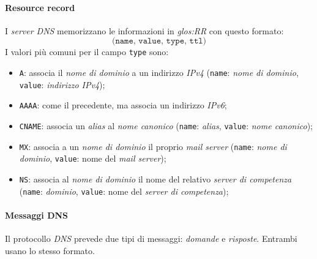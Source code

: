 \paragraph{Resource record}
I \emph{server DNS} memorizzano le informazioni in \emph{\gls{glos:RR}} con questo
formato:
\[\texttt{(name, value, type, ttl)}\]
I valori più comuni per il campo \texttt{type} sono:
\begin{itemize}
    \item \texttt{A}: associa il \emph{nome di dominio} a un indirizzo \emph{IPv4}
    (\texttt{name}: \emph{nome di dominio}, \texttt{value}: \emph{indirizzo IPv4});
    \item \texttt{AAAA}: come il precedente, ma associa un indirizzo \emph{IPv6};
    \item \texttt{CNAME}: associa un \emph{alias} al \emph{nome canonico}
    (\texttt{name}: \emph{alias}, \texttt{value}: \emph{nome canonico});
    \item \texttt{MX}: associa a un \emph{nome di dominio} il proprio \emph{mail
    server} (\texttt{name}: \emph{nome di dominio}, \texttt{value}: nome del
    \emph{mail server});
    \item \texttt{NS}: associa al \emph{nome di dominio} il nome del relativo
    \emph{server di competenza} (\texttt{name}: \emph{dominio}, \texttt{value}:
    nome del \emph{server di competenza});
\end{itemize}

\paragraph{Messaggi DNS}
Il protocollo \emph{DNS} prevede due tipi di messaggi: \emph{domande} e
\emph{risposte}. Entrambi usano lo stesso formato.

